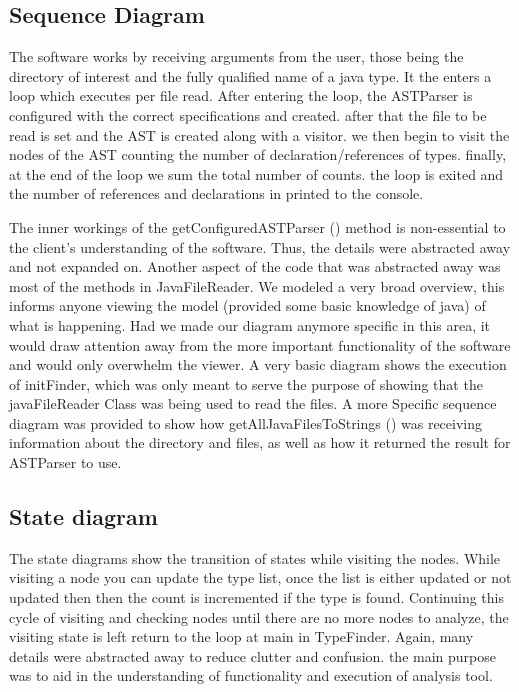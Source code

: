 \documentclass[12p]{article}
\begin{document}
\subsection{Sequence Diagram}

The software works by receiving arguments from the user, those being the directory of interest and the fully qualified name of a java type. It the enters a loop which executes per file read. After entering the loop, the ASTParser is configured with the correct specifications and created. after that the file to be read is set and the AST is created along with a visitor. we then begin to visit the nodes of the AST counting the number of declaration/references of types. finally, at the end of the loop we sum the total number of counts. the loop is exited and the number of references and declarations in printed to the console.

The inner workings of the getConfiguredASTParser () method is non-essential to the client's understanding of the software. Thus, the details were abstracted away and not expanded on. Another aspect of the code that was abstracted away was most of the methods in JavaFileReader. We modeled a very broad overview, this informs anyone viewing the model (provided some basic knowledge of java) of what is happening. Had we made our diagram anymore specific in this area, it would draw attention away from the more important functionality of the software and would only overwhelm the viewer. A very basic diagram shows the execution of initFinder, which was only meant to serve the purpose of showing that the javaFileReader Class was being used to read the files. A more Specific sequence diagram was provided to show how getAllJavaFilesToStrings () was receiving information about the directory and files, as well as how it returned the result for ASTParser to use.

\subsection{State diagram}

The state diagrams show the transition of states while visiting the nodes. While visiting a node you can update the type list, once the list is either updated or not updated then then the count is incremented if the type is found.  Continuing this cycle of visiting and checking nodes until there are no more nodes to analyze,   the visiting state is left  return to the loop at main in TypeFinder. Again, many details were abstracted away to reduce clutter and confusion. the main purpose was to aid in the understanding of functionality and execution of analysis tool.
\end{document}
